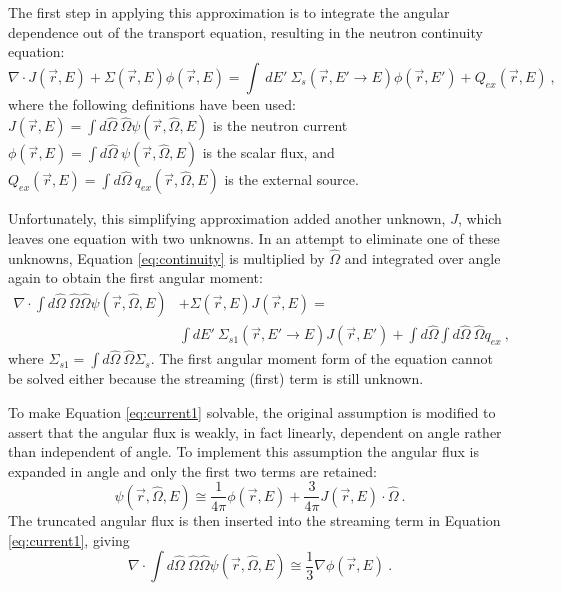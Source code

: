 \documentclass[12pt]{article}
\newcommand{\Macro}{\ensuremath{\Sigma}}
\newcommand{\vOmega}{\ensuremath{\hat{\Omega}}}
\begin{document}
The first step in applying this approximation is to integrate the angular dependence out of the transport equation, resulting in the neutron continuity equation:
%
\begin{equation}
  \nabla \cdot J(\vec{r},E) + \Macro(\vec{r},E)\phi(\vec{r},E) = \int \:dE' \:\Macro_{s}(\vec{r}, E' \to E)\phi(\vec{r},E') + Q_{ex}(\vec{r},E) \:,
  \label{eq:continuity} 
\end{equation}
%
where the following definitions have been used:\\
\indent $J(\vec{r},E) = \int d\vOmega \:\vOmega \psi(\vec{r}, \vOmega, E)$ is the neutron current \\
\indent  $\phi(\vec{r},E) = \int d\vOmega \:\psi(\vec{r}, \vOmega, E)$ is the scalar flux, and \\
\indent $Q_{ex} (\vec{r},E)= \int d\vOmega \:q_{ex}(\vec{r}, \vOmega, E)$ is the external source.

Unfortunately, this simplifying approximation added another unknown, $J$, which leaves one equation with two unknowns. In an attempt to eliminate one of these unknowns, Equation \eqref{eq:continuity} is multiplied by $\hat{\Omega}$ and integrated over angle again to obtain the first angular moment:
%
\begin{align}
  \nabla \cdot \int  d\vOmega \:\vOmega \vOmega \psi(\vec{r}, \vOmega, E) &+ \Macro(\vec{r},E) J(\vec{r},E)= \nonumber \\
  &\int dE' \:\Macro_{s1}(\vec{r}, E' \to E)J(\vec{r},E') + \int d\vOmega \int d\vOmega \:\vOmega q_{ex} \:,
  \label{eq:current1}
\end{align}
%
where $\Macro_{s1}  = \int d\vOmega \:\vOmega \Macro_{s}$. The first angular moment form of the equation cannot be solved either because the streaming (first) term is still unknown. 

To make Equation \eqref{eq:current1} solvable, the original assumption is modified to assert that the angular flux is weakly, in fact linearly, dependent on angle rather than independent of angle. To implement this assumption the angular flux is expanded in angle and only the first two terms are retained:  
%
\begin{equation}
  \psi(\vec{r}, \vOmega, E) \cong \frac{1}{4 \pi} \phi(\vec{r}, E) + \frac{3}{4 \pi}J(\vec{r}, E) \cdot \vOmega \:.
  \label{eq:angExpand} 
\end{equation}
The truncated angular flux is then inserted into the streaming term in Equation \eqref{eq:current1}, giving 
%
\begin{equation}
  \nabla \cdot \int d \vOmega \:\vOmega \vOmega \psi(\vec{r}, \vOmega, E)  \cong \frac{1}{3} \nabla \phi(\vec{r}, E) \:. 
  \label{eq:firstTerm}
\end{equation}
\end{document}
